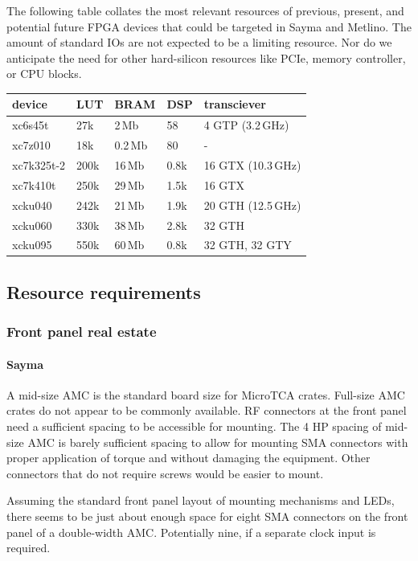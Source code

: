 \documentclass[11pt]{paper}
\begin{document}
The following table collates the most relevant resources of previous, present, and potential future FPGA devices that could be targeted in Sayma and Metlino.
The amount of standard IOs are not expected to be a limiting resource.
Nor do we anticipate the need for other hard-silicon resources like PCIe, memory controller, or CPU blocks.

\begin{tabular}{l|llll}
device   & LUT  & BRAM  & DSP  & transciever   \\\hline
xc6s45t  & 27k  & 2\,Mb   & 58   & 4 GTP (3.2\,GHz)   \\
xc7z010  & 18k  & 0.2\,Mb & 80   & -              \\
xc7k325t-2 & 200k & 16\,Mb  & 0.8k & 16 GTX (10.3\,GHz) \\
xc7k410t & 250k & 29\,Mb  & 1.5k & 16 GTX         \\
xcku040  & 242k & 21\,Mb  & 1.9k & 20 GTH (12.5\,GHz) \\
xcku060  & 330k & 38\,Mb  & 2.8k & 32 GTH         \\
xcku095  & 550k & 60\,Mb  & 0.8k & 32 GTH, 32 GTY \\
\end{tabular}

\subsection{Resource requirements}

\subsubsection{Front panel real estate}

\paragraph{Sayma} A mid-size AMC is the standard board size for MicroTCA crates. Full-size AMC crates do not appear to be commonly available.
RF connectors at the front panel need a sufficient spacing to be accessible for mounting.
The 4 HP spacing of mid-size AMC is barely sufficient spacing to allow for mounting SMA connectors with proper application of torque and without damaging the equipment.
Other connectors that do not require screws would be easier to mount.

Assuming the standard front panel layout of mounting mechanisms and LEDs, there seems to be just about enough space for eight SMA connectors on the front panel of a double-width AMC.
Potentially nine, if a separate clock input is required.
\end{document}
